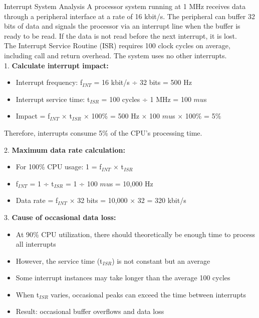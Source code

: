 \begin{example2}{Interrupt System Analysis}
A processor system running at 1 MHz receives data through a peripheral interface at a rate of 16 kbit/s. The peripheral can buffer 32 bits of data and signals the processor via an interrupt line when the buffer is ready to be read. If the data is not read before the next interrupt, it is lost.
\vspace{1mm}\\
The Interrupt Service Routine (ISR) requires 100 clock cycles on average, including call and return overhead. The system uses no other interrupts.
\vspace{1mm}\\
1. \textbf{Calculate interrupt impact:}
   \begin{itemize}
     \item Interrupt frequency: f$_{INT}$ = 16 kbit/s ÷ 32 bits = 500 Hz
     \item Interrupt service time: t$_{ISR}$ = 100 cycles ÷ 1 MHz = 100 $mu$s
     \item Impact = f$_{INT}$ × t$_{ISR}$ × 100\% = 500 Hz × 100 $mu$s × 100\% = 5\%
   \end{itemize}
   Therefore, interrupts consume 5\% of the CPU's processing time.

2. \textbf{Maximum data rate calculation:}
   \begin{itemize}
     \item For 100\% CPU usage: 1 = f$_{INT}$ × t$_{ISR}$
     \item f$_{INT}$ = 1 ÷ t$_{ISR}$ = 1 ÷ 100 $mu$s = 10,000 Hz
     \item Data rate = f$_{INT}$ × 32 bits = 10,000 × 32 = 320 kbit/s
   \end{itemize}

3. \textbf{Cause of occasional data loss:}
   \begin{itemize}
     \item At 90\% CPU utilization, there should theoretically be enough time to process all interrupts
     \item However, the service time (t$_{ISR}$) is not constant but an average
     \item Some interrupt instances may take longer than the average 100 cycles
     \item When t$_{ISR}$ varies, occasional peaks can exceed the time between interrupts
     \item Result: occasional buffer overflows and data loss
   \end{itemize}
\end{example2}


